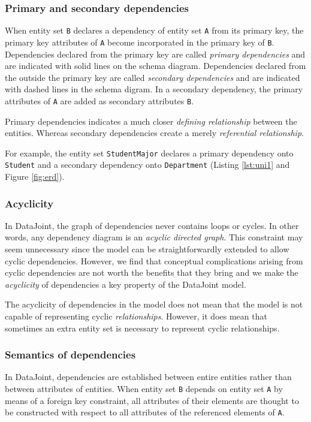 \documentclass[letter,10pt]{article}
\newcommand{\datajoint}{DataJoint\xspace}
\begin{document}
\subsubsection{Primary and secondary dependencies}
When entity set \lstinline$B$ declares a dependency of entity set \lstinline$A$ from its primary key, the primary key attributes of \lstinline$A$ become incorporated in the primary key of \lstinline$B$.  
Dependencies declared from the primary key are called \emph{primary dependencies} and are indicated with solid lines on the schema diagram. 
Dependencies declared from the outside the primary key are called \emph{secondary dependencies} and are indicated with dashed lines in the schema digram.  
In a secondary dependency, the primary attributes of \lstinline$A$ are added as secondary attributes \lstinline$B$. 

Primary dependencies indicates a much closer \emph{defining relationship} between the entities. Whereas secondary dependencies create a merely \emph{referential relationship}.

For example, the entity set \lstinline$StudentMajor$ declares a primary dependency onto \lstinline$Student$ and a secondary dependency onto \lstinline$Department$ (Listing \ref{lst:uni1} and Figure \ref{fig:erd}).

\subsubsection{Acyclicity}
In \datajoint, the graph of dependencies never contains loops or cycles.  
In other words, any dependency diagram is an \emph{acyclic directed graph}.
This constraint may seem unnecessary since the model can be straightforwardly extended to allow cyclic dependencies. 
However, we find that conceptual complications arising from cyclic dependencies are not worth the benefits that they bring and we make the \emph{acyclicity} of dependencies a key property of the \datajoint model.

The acyclicity of dependencies in the model does not mean that the model is not capable of representing cyclic \emph{relationships}. 
However, it does mean that sometimes an extra entity set is necessary to represent cyclic relationships. 

\subsubsection{Semantics of dependencies}\label{sec:semantics}
In \datajoint, dependencies are established between entire entities rather than between attributes of entities.  
When entity set \lstinline$B$ depends on entity set \lstinline$A$ by means of a foreign key constraint, all attributes of their elements are thought to be constructed with respect to all attributes of the referenced elements of \lstinline$A$.
\end{document}
